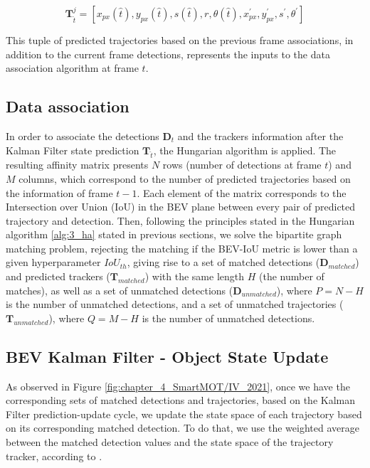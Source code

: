 \begin{equation}
	\label{est}
	\textbf{T}_{\hat{t}}^{j} = [x_{px}(\hat{t}),y_{px}(\hat{t}),s(\hat{t}),r,\theta(\hat{t}),x_{px}^{'},y_{px}^{'},s^{'},\theta^{'}]
\end{equation}

This tuple of predicted trajectories based on the previous frame associations, in addition to the current frame detections, represents the inputs to the data association algorithm at frame $t$.

\subsection{Data association}

In order to associate the detections $\textbf{D}_{t}$ and the trackers information after the Kalman Filter state prediction $\textbf{T}_{\hat{t}}$, the Hungarian algorithm is applied. The resulting affinity matrix presents $N$ rows (number of detections at frame $t$) and $M$ columns, which correspond to the number of predicted trajectories based on the information of frame $t-1$. Each element of the matrix corresponds to the Intersection over Union (IoU) in the \ac{BEV} plane between every pair of predicted trajectory and detection. Then, following the principles stated in the Hungarian algorithm \ref{alg:3_ha} stated in previous sections, we solve the bipartite graph matching problem, rejecting the matching if the BEV-IoU metric is lower than a given hyperparameter $IoU_{th}$, giving rise to a set of matched detections ($\textbf{D}_{matched}$) and predicted trackers ($\textbf{T}_{matched}$) with the same length $H$ (the number of matches), as well as a set of unmatched detections ($\textbf{D}_{unmatched}$), where $P = N - H$ is the number of unmatched detections, and a set of unmatched trajectories ($\textbf{T}_{unmatched}$), where $Q = M - H$ is the number of unmatched detections.

\subsection{BEV Kalman Filter - Object State Update}

As observed in Figure \ref{fig:chapter_4_SmartMOT/IV_2021}, once we have the corresponding sets of matched detections and trajectories, based on the Kalman Filter prediction-update cycle, we update the state space of each trajectory based on its corresponding matched detection. To do that, we use the weighted average between the matched detection values and the state space of the trajectory tracker, according to \cite{kalman1960new}. 

